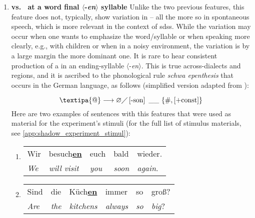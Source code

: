 \begin{enumerate}
	\item \textbf{\textipa{[@n]} vs.\ \textipa{[\s{n}]} at a word final $\langle$-\textit{en}$\rangle$ syllable}
	Unlike the two previous features, this feature does not, typically, show variation in -- all the more so in spontaneous speech, which is more relevant in the context of \acp{sds}.
	While the \textipa{[@n]} variation may occur when one wants to emphasize the word/syllable or when speaking more clearly, e.g., with children or when in a noisy environment, the \textipa{[\s{n}]} variation is by a large margin the more dominant one.
	It is rare to hear consistent production of a \textipa{[@n]} in an ending-syllable $\langle$-\textit{en}$\rangle$.
	This is true across-dialects and regions, and it is ascribed to the phonological rule \textit{schwa epenthesis} that occurs in the German language, as follows (simplified version adapted from \cite[pp.\,142--143]{Benware1986phonetics}):
	
	\begin{equation}
		\text{\textipa{@}} \longrightarrow \varnothing \diagup
		\left[\text{-son}\right] \ \_\_ \ \{\text{\#}, \left[\text{+const}\right]\}
		\label{eq:shcwa_elision_rule}
	\end{equation}
	Here are two examples of sentences with this features that were used as material for the experiment's stimuli (for the full list of stimulus materials, see \autoref{app:shadow_experiment_stimul}):
	
	\begin{enumerate}[label=\arabic{enumi}\alph*), ref=\arabic{enumi}\alph*.)]
		\item 
		\begin{tabulary}{\linewidth}{LLLLL}
			Wir & besuch\textbf{\underline{en}} & euch & bald & wieder.\\
			\textit{We} & \textit{will visit} & \textit{you} & \textit{soon} & \textit{again}.\\
		\end{tabulary}
		\item
		\begin{tabulary}{\linewidth}{LLLLLL}
			Sind & die & Küch\textbf{\underline{en}} & immer & so & groß?\\
			\textit{Are} & \textit{the} & \textit{kitchens} & \textit{always} & \textit{so} & \textit{big}?\\
		\end{tabulary}
	\end{enumerate}
\end{enumerate}



